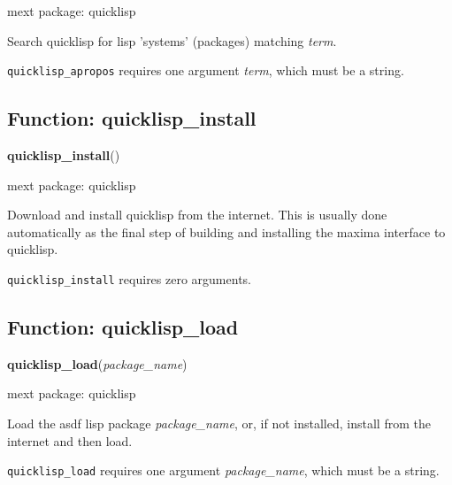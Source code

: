 \documentclass[]{article}
\begin{document}
\noindent mext package: quicklisp



\vspace{5 pt}
Search quicklisp for lisp 'systems' (packages) matching {\it term}. 

\vspace{5 pt}

   {\tt quicklisp\_apropos} requires one argument {\it term}, which must be a string.


\vspace{5 pt}


\subsection{Function: quicklisp\_install\label{sec:quicklisp_install}}
\hypertarget{quicklisp_install}{}
{\bf quicklisp\_install}()


\noindent mext package: quicklisp



\vspace{5 pt}
Download and install quicklisp from the internet. This is usually done automatically as the final step of building and installing the maxima interface to quicklisp. 

\vspace{5 pt}

   {\tt quicklisp\_install} requires zero arguments.


\vspace{5 pt}


\subsection{Function: quicklisp\_load\label{sec:quicklisp_load}}
\hypertarget{quicklisp_load}{}
{\bf quicklisp\_load}({\it package\_name})


\noindent mext package: quicklisp



\vspace{5 pt}
Load the asdf lisp package {\it package\_name}, or, if not installed, install from the internet and then load. 

\vspace{5 pt}

   {\tt quicklisp\_load} requires one argument {\it package\_name}, which must be a string.
\end{document}
